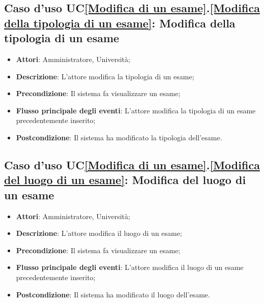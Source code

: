 \subsection{Caso d'uso UC\ref{Modifica di un esame}.\ref{Modifica della tipologia di un esame}: Modifica della tipologia di un esame}
\begin{itemize}
	\item \textbf{Attori}: Amministratore, Università;
	\item \textbf{Descrizione}: L'attore modifica la tipologia di un esame;
	
	\item \textbf{Precondizione}: Il sistema fa visualizzare un esame;
	
	\item \textbf{Flusso principale degli eventi}: L'attore modifica la tipologia di un esame precedentemente inserito;
	
	\item \textbf{Postcondizione}: Il sistema ha modificato la tipologia dell'esame.
	
\end{itemize}

\subsection{Caso d'uso UC\ref{Modifica di un esame}.\ref{Modifica del luogo di un esame}: Modifica del luogo di un esame}
\begin{itemize}
	\item \textbf{Attori}: Amministratore, Università;
	\item \textbf{Descrizione}: L'attore modifica il luogo di un esame;
	
	\item \textbf{Precondizione}: Il sistema fa visualizzare un esame;
	
	\item \textbf{Flusso principale degli eventi}: L'attore modifica il luogo di un esame precedentemente inserito;
	
	\item \textbf{Postcondizione}: Il sistema ha modificato il luogo dell'esame.
	
\end{itemize}

